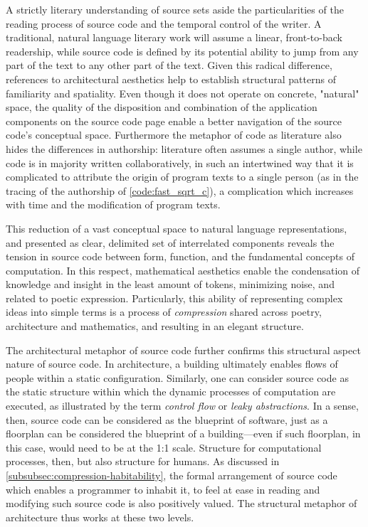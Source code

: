A strictly literary understanding of source sets aside the particularities of the reading process of source code and the temporal control of the writer. A traditional, natural language literary work will assume a linear, front-to-back readership, while source code is defined by its potential ability to jump from any part of the text to any other part of the text. Given this radical difference, references to architectural aesthetics help to establish structural patterns of familiarity and spatiality. Even though it does not operate on concrete, "natural" space, the quality of the disposition and combination of the application components on the source code page enable a better navigation of the source code's conceptual space. Furthermore the metaphor of code as literature also hides the differences in authorship: literature often assumes a single author, while code is in majority written collaboratively, in such an intertwined way that it is complicated to attribute the origin of program texts to a single person (as in the tracing of the authorship of \autoref{code:fast_sqrt_c}), a complication which increases with time and the modification of program texts.

This reduction of a vast conceptual space to natural language representations, and presented as clear, delimited set of interrelated components reveals the tension in source code between form, function, and the fundamental concepts of computation. In this respect, mathematical aesthetics enable the condensation of knowledge and insight in the least amount of tokens, minimizing noise, and related to poetic expression. Particularly, this ability of representing complex ideas into simple terms is a process of \emph{compression} shared across poetry, architecture and mathematics, and resulting in an elegant structure.

The architectural metaphor of source code further confirms this structural aspect nature of source code. In architecture, a building ultimately enables flows of people within a static configuration. Similarly, one can consider source code as the static structure within which the dynamic processes of computation are executed, as illustrated by the term \emph{control flow} or \emph{leaky abstractions}. In a sense, then, source code can be considered as the blueprint of software, just as a floorplan can be considered the blueprint of a building—even if such floorplan, in this case, would need to be at the 1:1 scale. Structure for computational processes, then, but also structure for humans. As discussed in \autoref{subsubsec:compression-habitability}, the formal arrangement of source code which enables a programmer to inhabit it, to feel at ease in reading and modifying such source code is also positively valued. The structural metaphor of architecture thus works at these two levels.

